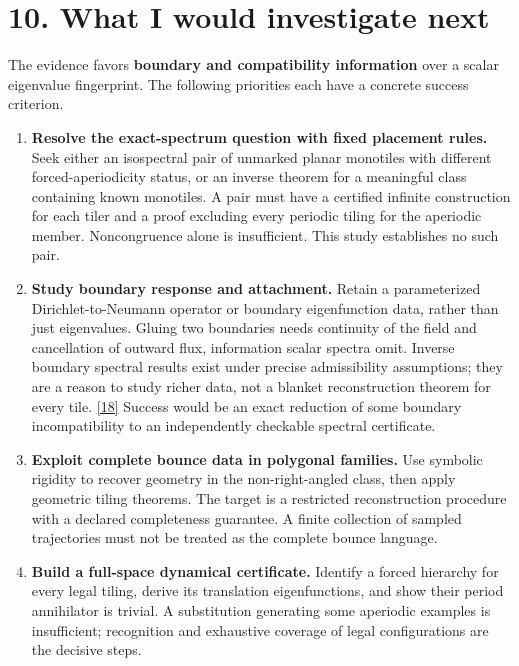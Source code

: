 \documentclass[11pt]{article}
\begin{document}
\section*{10. What I would investigate next}


The evidence favors \textbf{boundary and compatibility information} over a scalar eigenvalue fingerprint. The following priorities each have a concrete success criterion.



\begin{enumerate}


\item \textbf{Resolve the exact-spectrum question with fixed placement rules.} Seek either an isospectral pair of unmarked planar monotiles with different forced-aperiodicity status, or an inverse theorem for a meaningful class containing known monotiles. A pair must have a certified infinite construction for each tiler and a proof excluding every periodic tiling for the aperiodic member. Noncongruence alone is insufficient. This study establishes no such pair.

\item \textbf{Study boundary response and attachment.} Retain a parameterized Dirichlet-to-Neumann operator or boundary eigenfunction data, rather than just eigenvalues. Gluing two boundaries needs continuity of the field and cancellation of outward flux, information scalar spectra omit. Inverse boundary spectral results exist under precise admissibility assumptions; they are a reason to study richer data, not a blanket reconstruction theorem for every tile. \hyperlink{ref18}{[18]} Success would be an exact reduction of some boundary incompatibility to an independently checkable spectral certificate.

\item \textbf{Exploit complete bounce data in polygonal families.} Use symbolic rigidity to recover geometry in the non-right-angled class, then apply geometric tiling theorems. The target is a restricted reconstruction procedure with a declared completeness guarantee. A finite collection of sampled trajectories must not be treated as the complete bounce language.

\item \textbf{Build a full-space dynamical certificate.} Identify a forced hierarchy for every legal tiling, derive its translation eigenfunctions, and show their period annihilator is trivial. A substitution generating some aperiodic examples is insufficient; recognition and exhaustive coverage of legal configurations are the decisive steps.

\end{enumerate}
\end{document}
